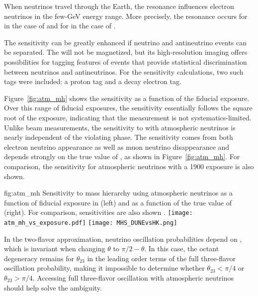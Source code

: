 When neutrinos travel through the Earth, the  resonance influences 
electron neutrinos in the few-\si{GeV} energy range. More precisely, the resonance 
occurs for \nue in the case of  and for \anue in the case of .

The  sensitivity can be greatly enhanced if neutrino and antineutrino events can be 
separated. The   will not be magnetized, but its high-resolution 
imaging offers possibilities for tagging features of events that provide statistical 
discrimination between neutrinos and antineutrinos. For the sensitivity calculations, 
two such tags were included: a proton tag and a decay electron tag. 

Figure~\ref{fig:atm_mh} shows the  sensitivity as a function of the fiducial exposure.  Over this range of fiducial exposures, the sensitivity essentially follows the square root of the exposure, indicating that the measurement is not systematics-limited. Unlike beam measurements, the sensitivity to  with atmospheric neutrinos is nearly independent of the  violating phase.  The sensitivity comes from both electron neutrino appearance as well as muon neutrino disappearance and depends strongly on the true value of , as shown in Figure~\ref{fig:atm_mh}. For comparison, the sensitivity for \hyperk atmospheric neutrinos with a \SI{1900}{\ktyr} exposure is also shown.

\begin{dunefigure}
{fig:atm_mh}
{Sensitivity to mass hierarchy using atmospheric neutrinos as a function of fiducial exposure in  (left) and as a function of the true value of  (right).  For comparison, \hyperk sensitivities are also shown \cite{Abe:2018uyc}.}
\texttt{[image: atm\_mh\_vs\_exposure.pdf]}
\texttt{[image: MHS\_DUNEvsHK.png]}
\end{dunefigure}

In the two-flavor approximation, neutrino oscillation probabilities depend on 
\sinst, which is invariant when changing $\theta$ to $\pi/2-\theta$. In this case, the octant degeneracy remains for $\theta_{23}$ in the leading order terms of the full 
three-flavor oscillation probability, making it impossible to determine whether $\theta_{23}< \pi/4$ or 
$\theta_{23}> \pi/4$. Accessing full three-flavor oscillation with atmospheric neutrinos 
should help solve the ambiguity.


